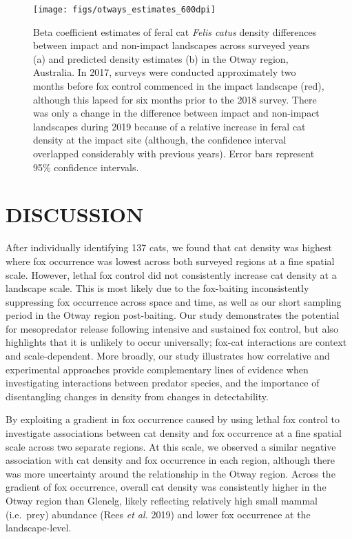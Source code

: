 \documentclass[]{elsarticle} %
\begin{document}
\newpage

\begin{figure}
\texttt{[image: figs/otways\_estimates\_600dpi]} \caption{Beta coefficient estimates of feral cat \textit{Felis catus} density differences between impact and non-impact landscapes across surveyed years (a) and predicted density estimates (b) in the Otway region, Australia. In 2017, surveys were conducted approximately two months before fox control commenced in the impact landscape (red), although this lapsed for six months prior to the 2018 survey. There was only a change in the difference between impact and non-impact landscapes during 2019 because of a relative increase in feral cat density at the impact site (although, the confidence interval overlapped considerably with previous years). Error bars represent 95\% confidence intervals.}\label{fig:diffo}
\end{figure}

\newpage

\hypertarget{discussion}{%
\section{DISCUSSION}\label{discussion}}

After individually identifying 137 cats, we found that cat density was highest where fox occurrence was lowest across both surveyed regions at a fine spatial scale. However, lethal fox control did not consistently increase cat density at a landscape scale. This is most likely due to the fox-baiting inconsistently suppressing fox occurrence across space and time, as well as our short sampling period in the Otway region post-baiting. Our study demonstrates the potential for mesopredator release following intensive and sustained fox control, but also highlights that it is unlikely to occur universally; fox-cat interactions are context and scale-dependent. More broadly, our study illustrates how correlative and experimental approaches provide complementary lines of evidence when investigating interactions between predator species, and the importance of disentangling changes in density from changes in detectability.

By exploiting a gradient in fox occurrence caused by using lethal fox control to investigate associations between cat density and fox occurrence at a fine spatial scale across two separate regions. At this scale, we observed a similar negative association with cat density and fox occurrence in each region, although there was more uncertainty around the relationship in the Otway region. Across the gradient of fox occurrence, overall cat density was consistently higher in the Otway region than Glenelg, likely reflecting relatively high small mammal (i.e.~prey) abundance (Rees \emph{et al.} 2019) and lower fox occurrence at the landscape-level.
\end{document}
